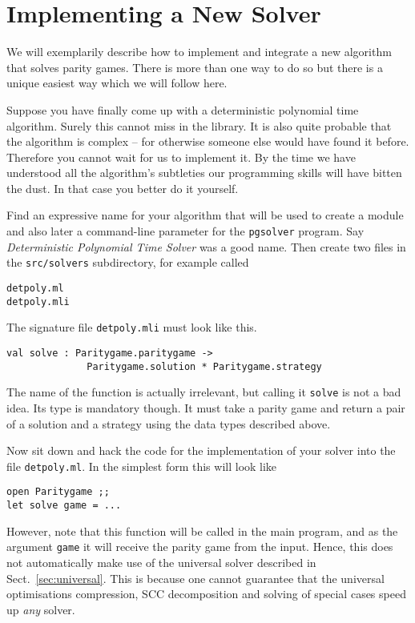 \section{Implementing a New Solver}

We will exemplarily describe how to implement and integrate a new algorithm that solves parity games. There
is more than one way to do so but there is a unique easiest way which we will follow here.

Suppose you have finally come up with a deterministic polynomial time algorithm. Surely this cannot miss in
the \pgsolver library. It is also quite probable that the algorithm is complex -- for otherwise someone
else would have found it before. Therefore you cannot wait for us to implement it. By the time we have
understood all the algorithm's subtleties our programming skills will have bitten the dust. In that case you
better do it yourself.

Find an expressive name for your algorithm that will be used to create a module and also later a command-line
parameter for the \texttt{pgsolver} program. Say \emph{Deterministic Polynomial Time Solver} was a good name.
Then create two files in the \texttt{src/solvers} subdirectory, for example called
\begin{verbatim}
detpoly.ml
detpoly.mli
\end{verbatim}
The signature file \texttt{detpoly.mli} must look like this.
\begin{verbatim}
val solve : Paritygame.paritygame ->
              Paritygame.solution * Paritygame.strategy
\end{verbatim}
The name of the function is actually irrelevant, but calling it \texttt{solve} is not a bad idea. Its type
is mandatory though. It must take a parity game and return a pair of a solution and a strategy using the
data types described above.

Now sit down and hack the code for the implementation of your solver into the file \texttt{detpoly.ml}. In the
simplest form this will look like
\begin{verbatim}
open Paritygame ;;
let solve game = ...
\end{verbatim}
However, note that this function will be called in the main program, and as the argument \texttt{game} it will
receive the parity game from the input. Hence, this does not automatically make use of the universal solver
described in Sect.~\ref{sec:universal}. This is because one cannot guarantee that the universal optimisations
compression, SCC decomposition and solving of special cases speed up \emph{any} solver.

